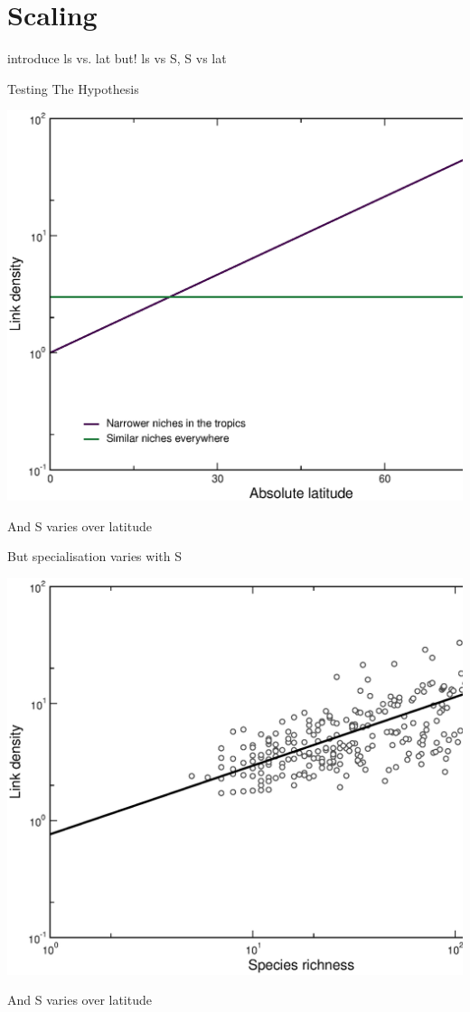 \documentclass{beamer}
\begin{document}
\section*{Scaling}

  introduce ls vs. lat
  but! ls vs S, S vs lat
  \begin{frame}{Testing The Hypothesis}
    \begin{center}
      \includegraphics[width=.8\textwidth]{Figures/results/LS_vs_lat_simulated.eps}

      {\color{white} And S varies over latitude}
    \end{center}
  \end{frame}


  \begin{frame}{But specialisation varies with S}
    \begin{center}
      \includegraphics[width=.8\textwidth]{Figures/results/LS_vs_S_fitline_observed.eps}

      {\color{white} And S varies over latitude}
    \end{center}
  \end{frame}
\end{document}
